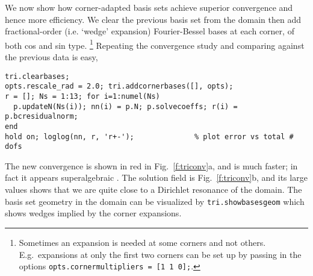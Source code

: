 We now show how corner-adapted basis sets
achieve superior convergence and hence
more efficiency. We clear the previous basis set from the domain
then add fractional-order (i.e. `wedge' expansion) Fourier-Bessel bases
at each corner, of both cos and sin type.%
  \footnote{Sometimes an expansion is needed at some corners and not
    others. E.g.\ expansions at only the first two corners can be
    set up by passing in the options {\tt opts.cornermultipliers = [1 1 0];}.}
Repeating the convergence study and comparing against the previous data is easy,
\begin{verbatim}
tri.clearbases;
opts.rescale_rad = 2.0; tri.addcornerbases([], opts);
r = []; Ns = 1:13; for i=1:numel(Ns)
  p.updateN(Ns(i)); nn(i) = p.N; p.solvecoeffs; r(i) = p.bcresidualnorm;
end
hold on; loglog(nn, r, 'r+-');              % plot error vs total # dofs
\end{verbatim}
The new convergence is shown in red in Fig.~\ref{f:triconv}a,
and is much faster; in fact it appears superalgebraic \cite{timothesis}.
The solution field is Fig.~\ref{f:triconv}b, and its large values
shows that we are quite close to a Dirichlet resonance of the domain.
The basis set geometry in the domain can be visualized by
{\tt tri.showbasesgeom} which shows wedges implied by the corner
expansions.

